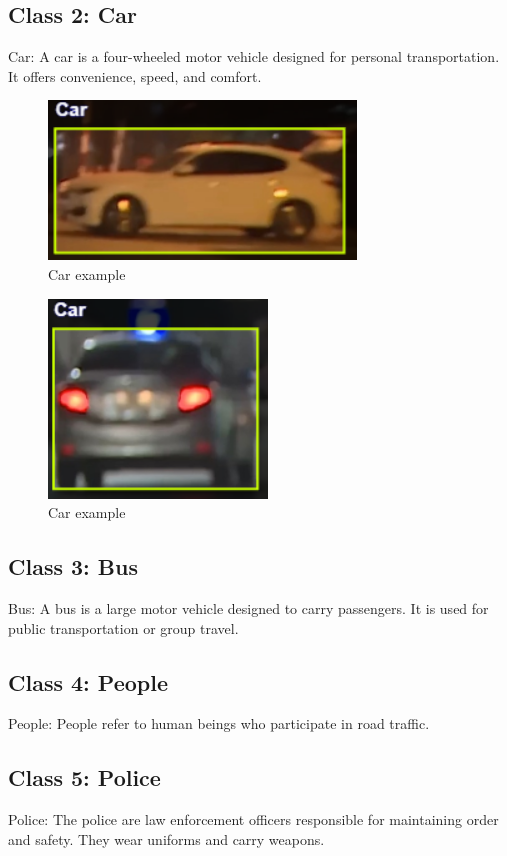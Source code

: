 \documentclass[a4paper,11pt]{article}
\theoremstyle{mytheor}
\begin{document}
\subsection{Class 2: Car}
Car: A car is a four-wheeled motor vehicle designed for personal transportation. It offers convenience, speed, and comfort. 
\begin{figure}
    \centering
    \includegraphics[width=0.5\linewidth]{images/car2.png}
    \caption{Car example}
    \label{fig:enter-label}
\end{figure}

 \begin{figure}
     \centering
     \includegraphics[width=0.5\linewidth]{images/car1.png}
     \caption{Car example}
     \label{fig:enter-label}
 \end{figure}
\subsection{Class 3: Bus}
Bus: A bus is a large motor vehicle designed to carry passengers. It is used for public transportation or group travel. 
 
\subsection{Class 4: People}
People: People refer to human  beings who  participate in road traffic.

 
\subsection{Class 5: Police}
Police: The police are law enforcement officers responsible for maintaining order and safety. They wear uniforms and carry weapons. 
\end{document}
